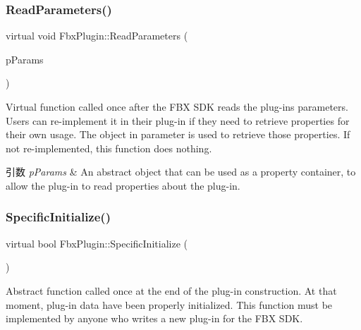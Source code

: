 \subsubsection{\texorpdfstring{Read\+Parameters()}{ReadParameters()}}
{\footnotesize\ttfamily virtual void Fbx\+Plugin\+::\+Read\+Parameters (\begin{DoxyParamCaption}\item[{\hyperlink{class_fbx_object}{Fbx\+Object} \&}]{p\+Params }\end{DoxyParamCaption})\hspace{0.3cm}{\ttfamily [virtual]}}

Virtual function called once after the F\+BX S\+DK reads the plug-\/in\textquotesingle{}s parameters. Users can re-\/implement it in their plug-\/in if they need to retrieve properties for their own usage. The object in parameter is used to retrieve those properties. If not re-\/implemented, this function does nothing. 
\begin{DoxyParams}{引数}
{\em p\+Params} & An abstract object that can be used as a property container, to allow the plug-\/in to read properties about the plug-\/in. \\
\hline
\end{DoxyParams}
\mbox{\label{class_fbx_plugin_a5b6ba0af2c0cf8a7d5cb1680407d9e7e}} 
\subsubsection{\texorpdfstring{Specific\+Initialize()}{SpecificInitialize()}}
{\footnotesize\ttfamily virtual bool Fbx\+Plugin\+::\+Specific\+Initialize (\begin{DoxyParamCaption}{ }\end{DoxyParamCaption})\hspace{0.3cm}{\ttfamily [pure virtual]}}

Abstract function called once at the end of the plug-\/in construction. At that moment, plug-\/in data have been properly initialized. This function must be implemented by anyone who writes a new plug-\/in for the F\+BX S\+DK. \mbox{\label{class_fbx_plugin_ade394d2752689a4690a29b34d347446e}} 
